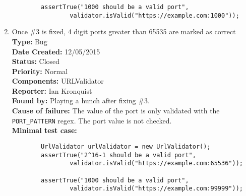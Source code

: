 \documentclass[12pt,letterpaper]{article}
\begin{document}
\begin{enumerate}
\begin{verbatim}
        assertTrue("1000 should be a valid port",
                validator.isValid("https://example.com:1000"));
    \end{verbatim}



    \item Once \#3 is fixed, 4 digit ports greater than 65535 are marked as correct\\
    \textbf{Type:} Bug\\
    \textbf{Date Created:} 12/05/2015\\
    \textbf{Status:} Closed\\
    \textbf{Priority:} Normal\\
    \textbf{Components:} URLValidator\\
    \textbf{Reporter:} Ian Kronquist\\

    \textbf{Found by:} Playing a hunch after fixing \#3.\\
    \textbf{Cause of failure:} The value of the port is only validated with the \texttt{PORT\_PATTERN} regex. The port value is not checked.\\
    \textbf{Minimal test case:}
    \begin{verbatim}
        UrlValidator urlValidator = new UrlValidator();
        assertTrue("2^16-1 should be a valid port",
                validator.isValid("https://example.com:65536"));

        assertTrue("1000 should be a valid port",
                validator.isValid("https://example.com:99999"));
    \end{verbatim}
\end{enumerate}
\end{document}
